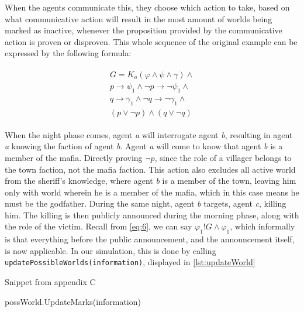 When the agents communicate this, they choose which action to take, based on
what communicative action will result in the most amount of worlds being marked
as inactive, whenever the proposition provided by the communicative action is
proven or disproven. This whole sequence of the original example can be
expressed by the following formula:

\begin{align}
	\begin{split}
		G = K_a(\varphi \land \psi \land\gamma)\land                        \\
		p \rightarrow \psi_1 \land \neg p \rightarrow \neg \psi_1 \land     \\
		q \rightarrow \gamma_1 \land \neg q \rightarrow \neg \gamma_1 \land \\
		(p \lor \neg p) \land (q \lor \neg q)
		\label{eq:7}
	\end{split}
\end{align}

When the night phase comes, agent \textit{a} will interrogate agent \textit{b},
resulting in agent \textit{a} knowing the faction of agent \textit{b}. Agent
\textit{a} will come to know that agent \textit{b} is a member of the mafia.
Directly proving $\neg p$, since the role of a villager belongs to the town
faction, not the mafia faction. This action also excludes all active world from
the sheriff's knowledge, where agent \textit{b} is a member of the town,
leaving him only with world wherein he is a member of the mafia, which in this
case means he must be the godfather. During the same night, agent \textit{b}
targets, agent \textit{c}, killing him. The killing is then publicly announced
during the morning phase, along with the role of the victim. Recall from
\cref{eq:6}, we can say $\varphi_1!G\land\varphi_1$, which informally is that
everything before the public announcement, and the announcement itself, is now
applicable. In our simulation, this is done by calling
\lstinline[]{updatePossibleWorlds(information)}, displayed in
\ref{lst:updateWorld}

\begin{algorithm}[h]
	\caption{Snippet from appendix C}
	\begin{algorithmic}[1]
		\State possWorld.UpdateMarks(information)
		\EndFor
		\EndFor
		\EndFunction
	\end{algorithmic}
\end{algorithm}\label{lst:updateWorld}


